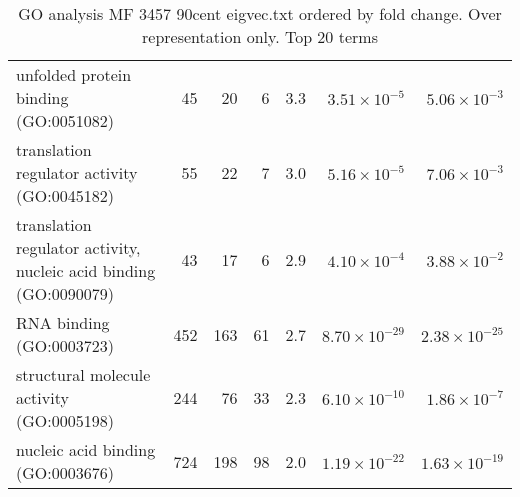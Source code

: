 \begin{table}[ht]
\begin{adjustbox}{width=\textwidth}
\begin{tabular}{lrrrrrr}
  unfolded protein binding (GO:0051082) & 45 & 20 & 6 & 3.3 & $3.51 \times 10^{-5}$ & $5.06 \times 10^{-3}$ \\ 
  translation regulator activity (GO:0045182) & 55 & 22 & 7 & 3.0 & $5.16 \times 10^{-5}$ & $7.06 \times 10^{-3}$ \\ 
  translation regulator activity, nucleic acid binding (GO:0090079) & 43 & 17 & 6 & 2.9 & $4.10 \times 10^{-4}$ & $3.88 \times 10^{-2}$ \\ 
  RNA binding (GO:0003723) & 452 & 163 & 61 & 2.7 & $8.70 \times 10^{-29}$ & $2.38 \times 10^{-25}$ \\ 
  structural molecule activity (GO:0005198) & 244 & 76 & 33 & 2.3 & $6.10 \times 10^{-10}$ & $1.86 \times 10^{-7}$ \\ 
  nucleic acid binding (GO:0003676) & 724 & 198 & 98 & 2.0 & $1.19 \times 10^{-22}$ & $1.63 \times 10^{-19}$ \\ 
   \hline
\end{tabular}
\end{adjustbox}
\caption{GO analysis MF 3457 90cent eigvec.txt ordered by fold change. Over representation only. Top 20 terms} 
\label{tab:GO analysis MF 3457 90cent eigvec.txt ordered by fold change. Over representation only. Top 20 terms}
\end{table}

